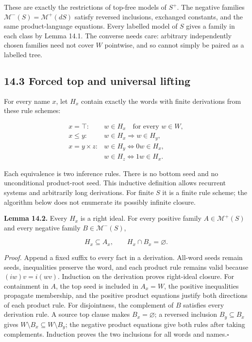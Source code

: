\documentclass[
  11pt,
  a4paper,
]{article}
\begin{document}
These are exactly the restrictions of top-free models of \(S^+\). The
negative families \(\mathcal M^-(S)=\mathcal M^+(dS)\) satisfy reversed
inclusions, exchanged constants, and the same product-language
equations. Every labelled model of \(S\) gives a family in each class by
Lemma 14.1. The converse needs care: arbitrary independently chosen
families need not cover \(W\) pointwise, and so cannot simply be paired
as a labelled tree.

\subsection{14.3 Forced top and universal
lifting}\label{forced-top-and-universal-lifting}

For every name \(x\), let \(H_x\) contain exactly the words with finite
derivations from these rule schemes:

\[\begin{array}{ll}
x=\top:& w\in H_x\quad\text{for every }w\in W,\\
x\le y:& w\in H_x\Longrightarrow w\in H_y,\\
x=y\times z:& w\in H_y\Longleftrightarrow0w\in H_x,\\
             & w\in H_z\Longleftrightarrow1w\in H_x.
\end{array}\]

Each equivalence is two inference rules. There is no bottom seed and no
unconditional product-root seed. This inductive definition allows
recurrent systems and arbitrarily long derivations. For finite \(S\) it
is a finite rule scheme; the algorithm below does not enumerate its
possibly infinite closure.


\textbf{Lemma 14.2.} Every \(H_x\) is a right ideal. For every positive
family \(A\in\mathcal M^+(S)\) and every negative family
\(B\in\mathcal M^-(S)\),

\[H_x\subseteq A_x,\qquad H_x\cap B_x=\varnothing.\]

\emph{Proof.} Append a fixed suffix to every fact in a derivation.
All-word seeds remain seeds, inequalities preserve the word, and each
product rule remains valid because \((iw)v=i(wv)\). Induction on the
derivation proves right-ideal closure. For containment in \(A\), the top
seed is included in \(A_x=W\), the positive inequalities propagate
membership, and the positive product equations justify both directions
of each product rule. For disjointness, the complement of \(B\)
satisfies every derivation rule. A source top clause makes
\(B_x=\varnothing\); a reversed inclusion \(B_y\subseteq B_x\) gives
\(W\setminus B_x\subseteq W\setminus B_y\); the negative product
equations give both rules after taking complements. Induction proves the
two inclusions for all words and names.\nobreak\hspace{.5em}\(\square\)
\end{document}
